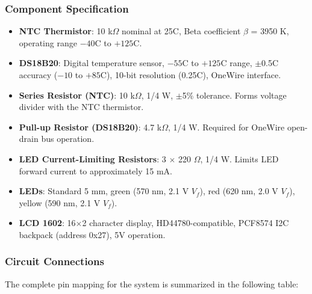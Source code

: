 \subsubsection{Component Specification}

\begin{itemize}
    \item \textbf{NTC Thermistor}: 10 k$\Omega$ nominal at 25\textdegree C, Beta coefficient $\beta$ = 3950 K, operating range $-40$\textdegree C to $+125$\textdegree C.
    \item \textbf{DS18B20}: Digital temperature sensor, $-55$\textdegree C to $+125$\textdegree C range, $\pm$0.5\textdegree C accuracy ($-10$ to $+85$\textdegree C), 10-bit resolution (0.25\textdegree C), OneWire interface.
    \item \textbf{Series Resistor (NTC)}: 10 k$\Omega$, 1/4 W, $\pm$5\% tolerance. Forms voltage divider with the NTC thermistor.
    \item \textbf{Pull-up Resistor (DS18B20)}: 4.7 k$\Omega$, 1/4 W. Required for OneWire open-drain bus operation.
    \item \textbf{LED Current-Limiting Resistors}: 3 $\times$ 220 $\Omega$, 1/4 W. Limits LED forward current to approximately 15 mA.
    \item \textbf{LEDs}: Standard 5 mm, green (570 nm, 2.1 V $V_f$), red (620 nm, 2.0 V $V_f$), yellow (590 nm, 2.1 V $V_f$).
    \item \textbf{LCD 1602}: 16$\times$2 character display, HD44780-compatible, PCF8574 I2C backpack (address 0x27), 5V operation.
\end{itemize}

\subsubsection{Circuit Connections}

The complete pin mapping for the system is summarized in the following table:

